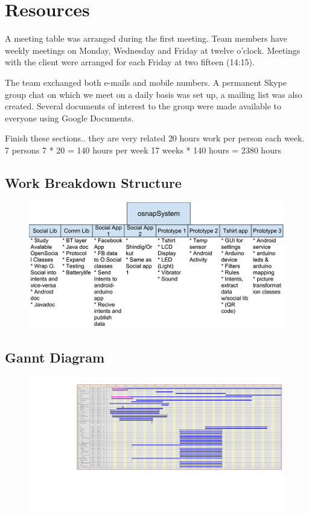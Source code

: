 \newpage
\section{Resources}
A meeting table was arranged during the first meeting. Team members
have weekly meetings on Monday, Wednesday and Friday at twelve o'clock.
Meetings with the client were arranged for each Friday at two fifteen (14:15).

The team exchanged both e-mails and mobile numbers. A permanent Skype
group chat on which we meet on a daily basis was set up, a mailing
list was also created. Several documents of interest to the group
were made available to everyone using Google Documents.

\todo
{
 Finish these sections.. they are very related
}
20 hours work per person each week.
7 persons
7 * 20 = 140 hours per week
17 weeks * 140 hours = 2380 hours

\subsection{Work Breakdown Structure}

\begin{figure}[h]
\centering \includegraphics{img/mgmt-wbs.png}
\label{fig:mgmt-wbs}
\end{figure}


\subsection{Gannt Diagram}

\begin{figure}[h]
\centering \includegraphics{img/mgmt-gantt.pdf}
\label{fig:mgmt-gantt}
\end{figure}

